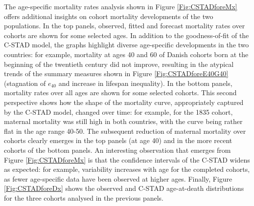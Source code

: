 \documentclass[11pt, a4paper]{article}
\begin{document}
The age-specific mortality rates analysis shown in Figure \ref{Fig:CSTADforeMx} offers additional insights on cohort mortality developments of the two populations. In the top panels, observed, fitted and forecast mortality rates over cohorts are shown for some selected ages. In addition to the goodness-of-fit of the C-STAD model, the graphs highlight diverse age-specific developments in the two countries: for example, mortality at ages 40 and 60 of Danish cohorts born at the beginning of the twentieth century did not improve, resulting in the atypical trends of the summary measures shown in Figure \ref{Fig:CSTADforeE40G40} (stagnation of $e_{40}$ and increase in lifespan inequality). In the bottom panels, mortality rates over all ages are shown for some selected cohorts. This second perspective shows how the shape of the mortality curve, appropriately captured by the C-STAD model, changed over time: for example, for the 1835 cohort, maternal mortality was still high in both countries, with the curve being rather flat in the age range 40-50. The subsequent reduction of maternal mortality over cohorts clearly emerges in the top panels (at age 40) and in the more recent cohorts of the bottom panels. An interesting observation that emerges from Figure \ref{Fig:CSTADforeMx} is that the confidence intervals of the C-STAD widens as expected: for example, variability increases with age for the completed cohorts, as fewer age-specific data have been observed at higher ages. Finally, Figure \ref{Fig:CSTADforeDx} shows the observed and C-STAD age-at-death distributions for the three cohorts analysed in the previous panels. 
\end{document}
